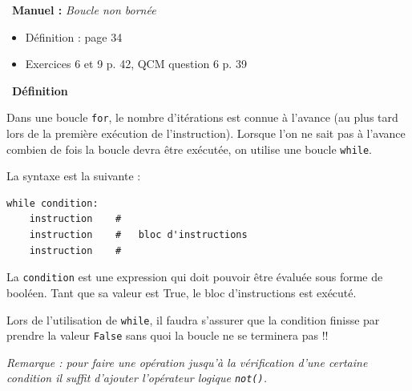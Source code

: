 \documentclass[a4paper, french, 12pt]{article}  %
\newcounter{rque}
\newcounter{def}
\newenvironment{definition}[1]
{\par \medskip   \addtocounter{def}{1} \noindent  
\begin{bclogo}[arrondi =0.1,  ombre = true, barre=none, logo=\bcbook, marge=4]{~\textbf{Définition} \textbf{\thedef} {\itshape #1} }  \par}
{
\end{bclogo}
 \par \bigskip }
\newcounter{logi}
\newenvironment{manuel}[1]
{\par \medskip  \noindent  
\begin{bclogo}[arrondi =0.1,   noborder = true, logo=\bcoeil, marge=4]{~\textbf{Manuel :}  {\itshape #1} }  \itshape \par}
{
\end{bclogo}
 \par \bigskip }
\begin{document}
\begin{manuel}{Boucle non bornée}
\begin{itemize}[label=]
 \item Définition  : page 34
 \item Exercices 6 et 9 p. 42, QCM question 6  p. 39
\end{itemize}
\end{manuel}

\begin{definition}{}


Dans une boucle \lstinline{for}, le nombre d'itérations est connue à l'avance (au plus tard lors de la première exécution de l'instruction). Lorsque l'on ne sait pas à l'avance combien de fois la boucle devra être exécutée, on utilise une boucle \lstinline{while}.

La syntaxe est la suivante : 


\begin{lstlisting}[style=rond]
while condition:
    instruction    #
    instruction    #   bloc d'instructions
    instruction    #
\end{lstlisting}

La \lstinline{condition} est une expression qui doit pouvoir être évaluée sous forme de booléen. Tant que sa valeur est True, le bloc d'instructions est exécuté.

\bcattention{} Lors de l'utilisation de \lstinline{while}, il faudra s'assurer que la condition finisse par prendre la valeur \texttt{False} sans quoi la boucle ne se terminera pas !!

\textit{Remarque : pour faire une opération jusqu'à la vérification d'une certaine condition il suffit d'ajouter l'opérateur logique \lstinline{not()}. }


\end{definition}
\end{document}
